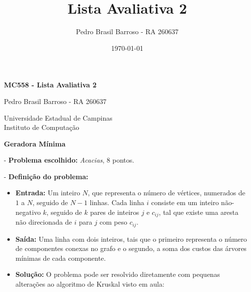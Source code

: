 \documentclass[
    12pt,
    a4paper,
    brazil,
    english
]{article}
\title{Lista Avaliativa 2}
\author{Pedro Brasil Barroso - RA 260637}
\date{\today} %
\begin{document}
\begin{titlepage}
    \centering

    \vspace*{6cm}

    {\LARGE \textbf{MC558 - Lista Avaliativa 2}}
    
    \vspace{5.5cm}
    {\Large Pedro Brasil Barroso - RA 260637}

    \vfill

    {\Large Universidade Estadual de Campinas} \\ %
    {\Large Instituto de Computação} \\

    \vspace{1cm}
\end{titlepage}

\textbf{ Geradora Mínima}
\vspace{0.5cm}

- \textbf{Problema escolhido:} \textit{Acacias}, 8 pontos.

\vspace{0.25cm}

- \textbf{Definição do problema:}
\begin{itemize}
    \item \textbf{Entrada:} Um inteiro $N$, que representa o número de vértices, numerados de $1$ a $N$,
    seguido de $N - 1$ linhas. Cada linha $i$ consiste em um inteiro não-negativo $k$, seguido de $k$
    pares de inteiros $j$ e $c_{ij}$, tal que existe uma aresta não direcionada de $i$ para $j$ com peso $c_{ij}$.
    \item \textbf{Saída:} Uma linha com dois inteiros, tais que o primeiro representa o número de componentes conexas no grafo e o segundo, a soma dos custos das árvores mínimas de cada componente.
    \item \textbf{Solução:} O problema pode ser resolvido diretamente com pequenas alterações ao algoritmo de Kruskal visto em aula:
\end{itemize}
\end{document}

